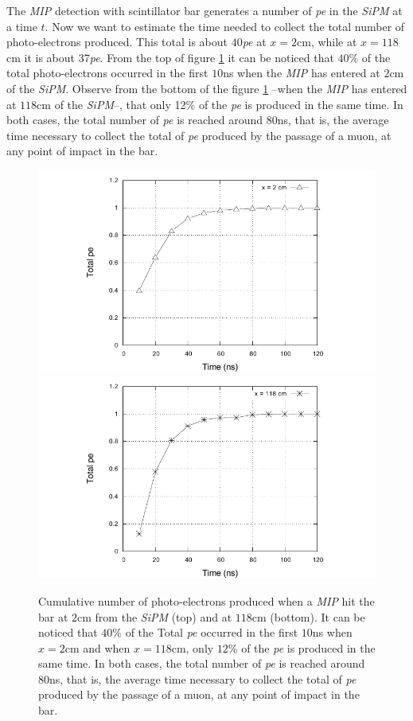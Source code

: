 \documentclass[submitting]{nst}
\begin{document}
The \textsl{MIP} detection with scintillator bar generates a number of \textsl{pe} in the \textsl{SiPM} at a time $t$. Now we want to estimate the time needed to collect the total number of photo-electrons produced. This total is about $40$\textsl{pe} at $x=2$cm, while at $x=118$cm it is about $37$\textsl{pe}. From the top of  figure \ref{cumulative} it can be noticed that $40$\% of the total photo-electrons occurred in the first $10$ns when the \textsl{MIP} has entered at $2$cm of the \textsl{SiPM}. Observe from the bottom of the figure \ref{cumulative} --when the \textsl{MIP} has entered at $118$cm of the \textsl{SiPM}--, that only 12\% of the \textsl{pe} is produced in the same time. In both cases, the total number of \textsl{pe} is reached around $80$ns, that is, the average time necessary to collect the total of \textsl{pe} produced by the passage of a muon, at any point of impact in the bar.
\begin{figure}[ht]
    \centering
    \includegraphics[scale=0.8]{Figures/cumulativo_1.pdf}
    \includegraphics[scale=0.8]{Figures/cumulativo_2.pdf}
    \caption{Cumulative number of photo-electrons produced when a \textsl{MIP} hit the bar at $2$cm from the  \textsl{SiPM} (top) and at $118$cm (bottom). It can be noticed that $40$\% of the Total \textsl{pe} occurred in the first $10$ns when $x=2$cm and when $x=118$cm, only $12$\% of the \textsl{pe} is produced in the same time. In both cases, the total number of \textsl{pe} is reached around $80$ns, that is, the average time necessary to collect the total of \textsl{pe} produced by the passage of a muon, at any point of impact in the bar.}
    \label{cumulative}
\end{figure}
\end{document}
